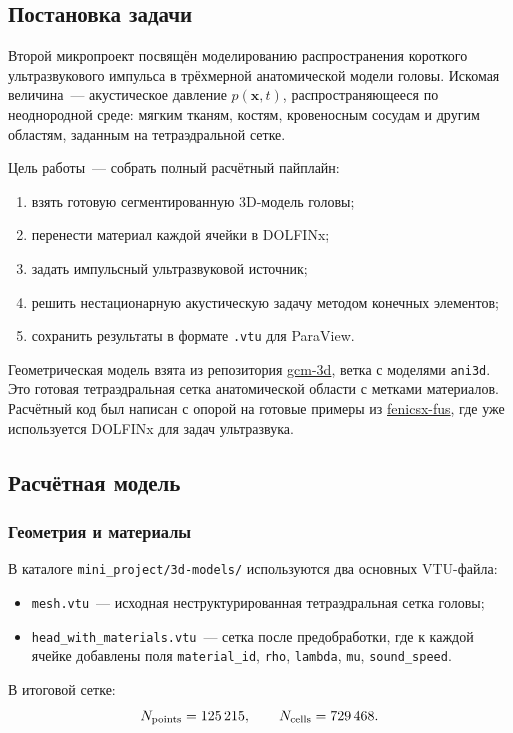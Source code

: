 \subsection{Постановка задачи}

Второй микропроект посвящён моделированию распространения короткого
ультразвукового импульса в трёхмерной анатомической модели головы.
Искомая величина~--- акустическое давление $p(\mathbf{x}, t)$,
распространяющееся по неоднородной среде: мягким тканям, костям,
кровеносным сосудам и другим областям, заданным на тетраэдральной сетке.

Цель работы~--- собрать полный расчётный пайплайн:
\begin{enumerate}
  \item взять готовую сегментированную 3D-модель головы;
  \item перенести материал каждой ячейки в DOLFINx;
  \item задать импульсный ультразвуковой источник;
  \item решить нестационарную акустическую задачу методом конечных элементов;
  \item сохранить результаты в формате \texttt{.vtu} для ParaView.
\end{enumerate}

Геометрическая модель взята из репозитория
\href{https://github.com/avasyukov/gcm-3d/tree/markered-corpse/models/ani3d}{gcm-3d},
ветка с моделями \texttt{ani3d}. Это готовая тетраэдральная сетка
анатомической области с метками материалов. Расчётный код был написан
с опорой на готовые примеры из
\href{https://github.com/adeebkor/fenicsx-fus}{fenicsx-fus}, где уже
используется DOLFINx для задач ультразвука.

\subsection{Расчётная модель}

\subsubsection{Геометрия и материалы}

В каталоге \texttt{mini\_project/3d-models/} используются два основных
VTU-файла:
\begin{itemize}
  \item \texttt{mesh.vtu}~--- исходная неструктурированная тетраэдральная
        сетка головы;
  \item \texttt{head\_with\_materials.vtu}~--- сетка после предобработки,
        где к каждой ячейке добавлены поля \texttt{material\_id},
        \texttt{rho}, \texttt{lambda}, \texttt{mu},
        \texttt{sound\_speed}.
\end{itemize}
В итоговой сетке:
\[
  N_{\rm points}=125\,215, \qquad N_{\rm cells}=729\,468.
\]


